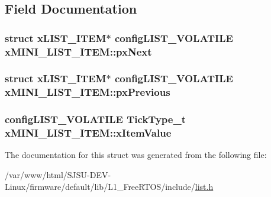 \subsection{Field Documentation}
\subsubsection[{\texorpdfstring{px\+Next}{pxNext}}]{\setlength{\rightskip}{0pt plus 5cm}struct {\bf x\+L\+I\+S\+T\+\_\+\+I\+T\+EM}$\ast$ {\bf config\+L\+I\+S\+T\+\_\+\+V\+O\+L\+A\+T\+I\+LE} x\+M\+I\+N\+I\+\_\+\+L\+I\+S\+T\+\_\+\+I\+T\+E\+M\+::px\+Next}\hypertarget{structxMINI__LIST__ITEM_aa7ae770b0f10daeb9ac76c6f7dd5608e}{}\label{structxMINI__LIST__ITEM_aa7ae770b0f10daeb9ac76c6f7dd5608e}
\subsubsection[{\texorpdfstring{px\+Previous}{pxPrevious}}]{\setlength{\rightskip}{0pt plus 5cm}struct {\bf x\+L\+I\+S\+T\+\_\+\+I\+T\+EM}$\ast$ {\bf config\+L\+I\+S\+T\+\_\+\+V\+O\+L\+A\+T\+I\+LE} x\+M\+I\+N\+I\+\_\+\+L\+I\+S\+T\+\_\+\+I\+T\+E\+M\+::px\+Previous}\hypertarget{structxMINI__LIST__ITEM_a732c666bb97560eb1b094a2c411269ab}{}\label{structxMINI__LIST__ITEM_a732c666bb97560eb1b094a2c411269ab}
\subsubsection[{\texorpdfstring{x\+Item\+Value}{xItemValue}}]{ {\bf config\+L\+I\+S\+T\+\_\+\+V\+O\+L\+A\+T\+I\+LE} {\bf Tick\+Type\+\_\+t} x\+M\+I\+N\+I\+\_\+\+L\+I\+S\+T\+\_\+\+I\+T\+E\+M\+::x\+Item\+Value}\hypertarget{structxMINI__LIST__ITEM_aae79c54ac1efa30959e68604cc23b29e}{}\label{structxMINI__LIST__ITEM_aae79c54ac1efa30959e68604cc23b29e}


The documentation for this struct was generated from the following file\+:\begin{DoxyCompactItemize}
\item 
/var/www/html/\+S\+J\+S\+U-\/\+D\+E\+V-\/\+Linux/firmware/default/lib/\+L1\+\_\+\+Free\+R\+T\+O\+S/include/\hyperlink{list_8h}{list.\+h}\end{DoxyCompactItemize}
